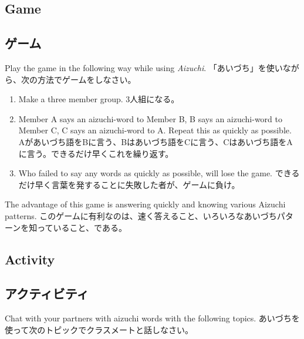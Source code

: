 \documentclass[uplatex,dvipdfmx,b5paper,english,10pt]{jsbook}
\begin{document}
\ifEnglish
\subsection{Game}
\else
\subsection{ゲーム}
\fi

\begin{toiquestion}
\ifEnglish
  Play the game in the following way while using {\it Aizuchi\/}.
\else
「あいづち」を使いながら、次の方法でゲームをしなさい。
\fi
\end{toiquestion}

\begin{enumerate} %
\item
\ifEnglish
  Make a three member group.
\else
  3人組になる。
\fi
\item
  \ifEnglish
  Member A says an aizuchi-word to Member B, B says an aizuchi-word to Member C, C says an aizuchi-word to A. Repeat this as quickly as possible.
  \else
  Aがあいづち語をBに言う、Bはあいづち語をCに言う、Cはあいづち語をAに言う。できるだけ早くこれを繰り返す。
  \fi
\item
  \ifEnglish
  Who failed to say any words as quickly as possible, will lose the game.
  \else
  できるだけ早く言葉を発することに失敗した者が、ゲームに負け。
  \fi
\end{enumerate}

\begin{toianswer}
\ifEnglish
The advantage of this game is answering quickly and knowing various Aizuchi patterns.
\else
このゲームに有利なのは、速く答えること、いろいろなあいづちパターンを知っていること、である。
\fi
\end{toianswer}

\ifEnglish
\subsection{Activity}
\else
\subsection{アクティビティ}
\fi

\begin{toiquestion}
\ifEnglish
Chat with your partners with aizuchi words with the following topics.
\else
あいづちを使って次のトピックでクラスメートと話しなさい。
\fi
\end{toiquestion}
\end{document}
